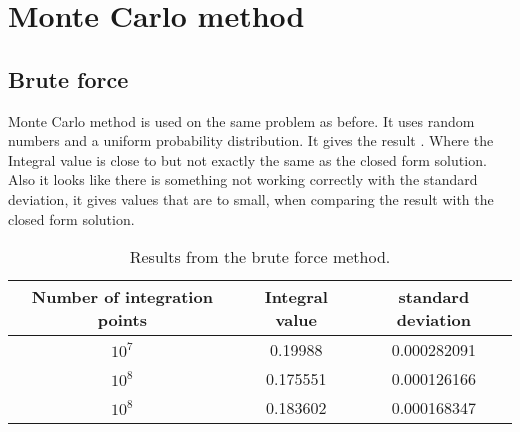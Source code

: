 \section{Monte Carlo method}
\subsection{Brute force}

Monte Carlo method is used on the same problem as before. It uses random numbers and a uniform probability distribution. It gives the result . Where the Integral value is close to but not exactly the same as the closed form solution. Also it looks like there is something not working correctly with the standard deviation, it gives values that are to small, when comparing the result with the closed form solution. 

\begin{table}[ht]
\centering
\caption{Results from the brute force method.}
\begin{center}
\begin{tabular}{c|c|c}

Number of integration points & Integral value & standard deviation \\
\hline
$10^7$ & 0.19988 & 0.000282091 \\
$10^8$ & 0.175551  & 0.000126166 \\
$10^8$ & 0.183602  & 0.000168347\\

\end{tabular}
\end{center}
\label{tab:BFM}
\end{table}

